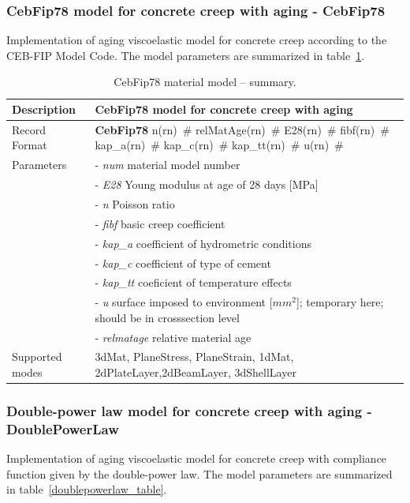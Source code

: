 \documentclass[a4paper]{article}
\newcommand{\descitem}[1]{{\noindent \bf #1}}
\newcommand{\elemparam}[2]{{{#1\tiny (#2)}~\#}}
\newcommand{\param}[1]{{\it #1}}
\begin{document}
\subsubsection{CebFip78 model for concrete creep with aging - CebFip78}
Implementation of aging viscoelastic model for concrete creep
according to the CEB-FIP Model Code.
The model parameters are summarized
in table~\ref{cebfip_table}.

\begin{table}[!htb]
\begin{tabular}{|l|p{9cm}|}
\hline
Description & CebFip78 model  for concrete creep with aging\\
\hline
Record Format & \descitem{CebFip78}  \elemparam{n}{rn}
\elemparam{relMatAge}{rn} \elemparam{E28}{rn} \elemparam{fibf}{rn} \elemparam{kap\_a}{rn}
\elemparam{kap\_c}{rn} \elemparam{kap\_tt}{rn} \elemparam{u}{rn}\\
Parameters &- \param{num} material model number\\
&- \param{E28} Young modulus at age of 28 days [MPa]\\
&- \param{n} Poisson ratio\\
&- \param{fibf} basic creep coefficient\\
&- \param{kap\_a} coefficient of hydrometric conditions\\
&- \param{kap\_c} coefficient of type of cement\\
&- \param{kap\_tt} coeficient of temperature effects\\
&- \param{u} surface imposed to environment [$mm^2$]; temporary here; should be in crosssection level\\
&- \param{relmatage} relative material age \\
Supported modes& 3dMat, PlaneStress, PlaneStrain, 1dMat,
2dPlateLayer,2dBeamLayer, 3dShellLayer\\
\hline
\end{tabular}
\caption{CebFip78 material model -- summary.}
\label{cebfip_table}
\end{table}



\subsubsection{Double-power law model for concrete creep with aging - DoublePowerLaw}
Implementation of aging viscoelastic model for concrete creep
with compliance function given by the double-power law.
The model parameters are summarized
in table~\ref{doublepowerlaw_table}.
\end{document}
